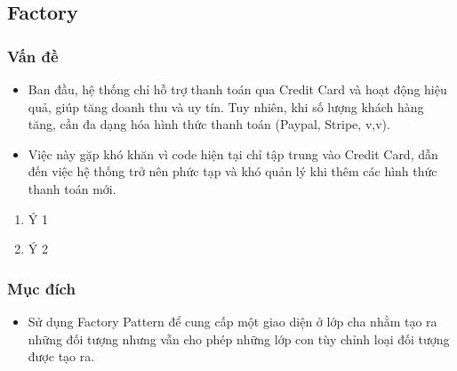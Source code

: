 \thispagestyle{empty}
\subsection{Factory}
\subsubsection{Vấn đề}
\begin{flushleft}
	\begin{itemize}
		\item Ban đầu, hệ thống chỉ hỗ trợ thanh toán qua Credit Card và hoạt động hiệu quả, giúp tăng doanh thu và uy tín. Tuy nhiên, khi số lượng khách hàng tăng, cần đa dạng hóa hình thức thanh toán (Paypal, Stripe, v,v). 

		\item Việc này gặp khó khăn vì code hiện tại chỉ tập trung vào Credit Card, dẫn đến việc hệ thống trở nên phức tạp và khó quản lý khi thêm các hình thức thanh toán mới.
	\end{itemize}

	\begin{enumerate}
		\item Ý 1
		\item Ý 2
	\end{enumerate}

\end{flushleft}

\subsubsection{Mục đích}
\begin{flushleft}

\begin{itemize}
    \item Sử dụng Factory Pattern để cung cấp một giao diện ở lớp cha nhằm tạo ra những đối tượng nhưng vẫn cho phép những lớp con tùy chỉnh loại đối tượng được tạo ra. 

\end{itemize}



\end{flushleft}

